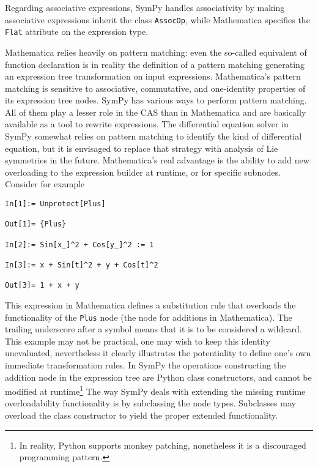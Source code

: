 
Regarding associative expressions,
SymPy handles associativity by making associative expressions inherit the
class \texttt{AssocOp},
while Mathematica specifies the \texttt{Flat}\cite{WolframRefFlat} attribute on the expression type.




Mathematica relies heavily on pattern matching:
even the so-called equivalent of function declaration is in reality
the definition of a pattern matching generating an expression tree transformation
on input expressions.
%
Mathematica's pattern matching is sensitive to associative\cite{WolframRefFlat}, commutative\cite{WolframRefOrderless},
and one-identity\cite{WolframRefOneIdentity} properties of its expression tree nodes\cite{WolframRefFlatAndOrderlessFunctions}.
%
SymPy has various ways to perform pattern matching.
All of them play a lesser role in the CAS than in Mathematica
and are basically available as a tool to rewrite expressions.
The differential equation solver in SymPy somewhat relies on pattern matching to
identify the kind of differential equation, but it is envisaged to replace
that strategy with analysis of Lie symmetries in the future.
Mathematica's real advantage is the ability to add new overloading to the
expression builder at runtime, or for specific subnodes.
Consider for example
\begin{verbatim}
In[1]:= Unprotect[Plus]

Out[1]= {Plus}

In[2]:= Sin[x_]^2 + Cos[y_]^2 := 1

In[3]:= x + Sin[t]^2 + y + Cos[t]^2

Out[3]= 1 + x + y
\end{verbatim}
This expression in Mathematica defines a substitution rule that overloads
the functionality of the \texttt{Plus} node (the node for additions in Mathematica).
The trailing underscore after a symbol means that it is to be considered a
wildcard.
This example may not be practical, one may wish to keep this identity
unevaluated, nevertheless it clearly illustrates the potentiality to define
one's own immediate transformation rules.
In SymPy the operations constructing the addition node in the expression tree
are Python class constructors,
and cannot be modified at runtime\footnote{In reality, Python supports monkey patching,
nonetheless it is a discouraged programming pattern.}
The way SymPy deals with extending the missing runtime overloadability functionality
is by subclassing the node types.
Subclasses may overload the class constructor to yield the proper
extended functionality.


